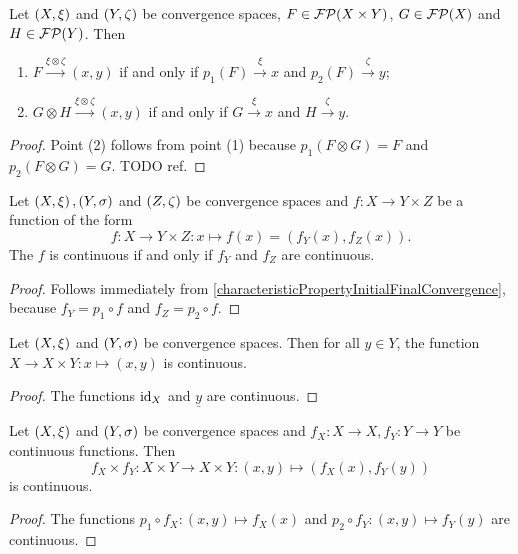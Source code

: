 \begin{lemma} \label{convergenceFiniteProductFilter}
Let $\left( X,\xi \right)$ and $\left( Y,\zeta \right)$ be convergence spaces, $F\in \operatorname{\mathcal{FP}}(X\times Y)$, $G\in \operatorname{\mathcal{FP}}(X)$ and $H\in \operatorname{\mathcal{FP}}(Y)$. Then
\begin{enumerate}
\item $F \overset{\xi \otimes \zeta}{\longrightarrow} (x,y)$ \textup{if and only if} $p_1(F) \overset{\xi}{\longrightarrow} x$ and $p_2(F) \overset{\zeta}{\longrightarrow} y$;
\item $G\otimes H \overset{\xi \otimes \zeta}{\longrightarrow} (x,y)$ \textup{if and only if} $G \overset{\xi}{\longrightarrow} x$ and $H \overset{\zeta}{\longrightarrow} y$.
\end{enumerate}
\end{lemma}
\begin{proof}
Point (2) follows from point (1) because $p_1(F\otimes G) = F$ and $p_2(F\otimes G) = G$. TODO ref.
\end{proof}


\begin{lemma}
Let $\left( X,\xi \right), \left( Y,\sigma \right)$ and $\left( Z,\zeta \right)$ be convergence spaces and $f: X\to Y\times Z$ be a function of the form
\[ f: X\to Y\times Z: x\mapsto f(x) = (f_Y(x), f_Z(x)). \]
The $f$ is continuous \textup{if and only if} $f_Y$ and $f_Z$ are continuous.
\end{lemma}
\begin{proof}
Follows immediately from \ref{characteristicPropertyInitialFinalConvergence},
because $f_Y = p_1\circ f$ and $f_Z = p_2\circ f$.
\end{proof}
\begin{corollary} \label{continuousEmbeddingProduct}
Let $\left( X,\xi \right)$ and $\left( Y,\sigma \right)$ be convergence spaces. Then for all $y\in Y$, the function $X\to X\times Y: x\mapsto (x,y)$ is continuous.
\end{corollary}
\begin{proof}
The functions $\operatorname{id}_X$ and $\underline{y}$ are continuous.
\end{proof}
\begin{corollary} \label{productContinuousFunctions}
Let $\left( X,\xi \right)$ and $\left( Y,\sigma \right)$ be convergence spaces and $f_X: X\to X, f_Y: Y\to Y$ be continuous functions. Then
\[ f_X\times f_Y: X\times Y \to X\times Y: (x,y)\mapsto (f_X(x), f_Y(y))  \]
is continuous.
\end{corollary}
\begin{proof}
The functions $p_1\circ f_X: (x,y) \mapsto f_X(x)$ and $p_2\circ f_Y: (x,y) \mapsto f_Y(y)$ are continuous.
\end{proof}


